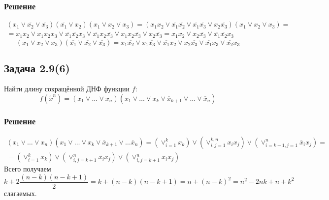 \documentclass[11pt]{article}
\begin{document}
\subsubsection{Решение}
\label{sec:org6b8ea13}
\begin{multline}
(x_1\vee\overline{x_2}\vee\overline{x_3})(\overline{x_1}\vee x_2)(x_1\vee x_2\vee x_3) =
(x_1x_2\vee\overline{x_1}\overline{x_2}\vee\overline{x_1}\overline{x_3}\vee x_2\overline{x_3})
(x_1\vee x_2\vee x_3) = \\
= x_1x_2\vee x_1x_2x_3\vee\overline{x_1}\overline{x_2}x_3\vee\overline{x_1}x_2\overline{x_3}\vee
x_1x_2\overline{x_3}\vee x_2\overline{x_3} = x_1x_2\vee x_2\overline{x_3}\vee\overline{x_1}\overline{x_2}x_3
\end{multline}
\begin{equation}
(x_1\vee x_2\vee x_3)(\overline{x_1}\vee\overline{x_2}\vee\overline{x_3})
= x_1\overline{x_2}\vee x_1\overline{x_3}\vee\overline{x_1}x_2\vee x_2\overline{x_3}\vee
\overline{x_1}x_3\vee\overline{x_2}x_3
\end{equation}
\subsection{Задача 2.9(6)}
\label{sec:orgaaa3a41}
Найти длину сокращённой ДНФ функции \(f\):
\begin{equation}
f(\tilde{x}^n) = (x_1\vee\ldots\vee x_n)(x_1\vee\ldots\vee x_k\vee\overline{x}_{k + 1}\vee\ldots\vee\overline{x}_n)
\end{equation}
\subsubsection{Решение}
\label{sec:org5900cfb}
\begin{multline}
(x_1\vee\ldots\vee x_n)(x_1\vee\ldots\vee x_k\vee\overline{x}_{k + 1}\vee\ldots\overline{x}_n) =
(\vee_{i = 1}^kx_k)\vee(\vee_{i, j = 1}^{k, n}x_ix_j)\vee(\vee_{i = k + 1, j = 1}^{n}\overline{x}_ix_j) = \\
= (\vee_{i = 1}^kx_k)\vee(\vee_{i, j = k + 1}^n\overline{x_i}x_j)\vee(\vee_{i, j = k + 1}^nx_ix_j)
\end{multline}
Всего получаем
\begin{equation}
k + 2\frac{(n - k)(n - k + 1)}2 = k + (n - k)(n - k + 1) = n + (n - k)^2 = n^2 - 2nk + n + k^2
\end{equation}
слагаемых.
\end{document}

